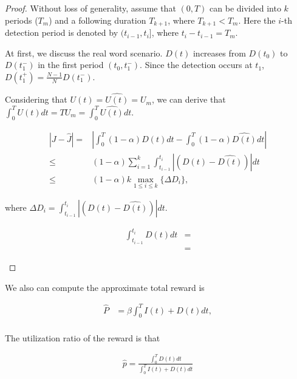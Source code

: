 \begin{proof}
Without loss of generality,
assume that $(0, T)$ can be divided into $k$ periods ($T_{m}$) and a following duration $T_{k+1}$, where $T_{k+1} < T_{m}$.
Here the $i$-th detection period is denoted by $(t_{i-1}, t_{i}]$, where $t_{i} - t_{i-1} = T_{m}$.

At first, we discuss the real word scenario.
$D(t)$ increases from $D(t_{0})$ to $D(t_{1}^{-})$ in the first period $(t_{0}, t_{1}^{-})$.
Since the detection occurs at $t_{1}$, $D(t_{1}^{+}) = \frac{N-1}{N}D(t_{1}^{-})$.

Considering that $U(t)= \hat{U(t)} = U_{m}$, 
we can derive that $\int_{0}^{T} U(t) dt = T U_{m} 
= \int_{0}^{T} \hat{U(t)} dt $.
\begin{small}
\begin{equation}
\label{eq:delta_J}
\begin{aligned}
|J - \hat{J}| = & | \int_{0}^{T} (1-\alpha)D(t) dt - \int_{0}^{T} (1-\alpha) \hat{D(t)} dt | \\
\le & (1-\alpha) \sum_{i=1}^{k} \int_{t_{i-1}}^{t_{i}} |(D(t)-\hat{D(t)})| dt \\
\le & (1-\alpha) k \max_{1 \le i \le k}\{ \Delta{D_{i}} \},
\end{aligned}
\end{equation}
\end{small}
where $\Delta{D_{i}} = \int_{t_{i-1}}^{t_{i}} |(D(t)-\hat{D(t)})| dt $.
\begin{small}
\begin{equation}
\nonumber
\begin{aligned}
\int_{t_{i-1}}^{t_{i}} D(t) dt 
&= \\
&= 
\end{aligned}
\end{equation}
\end{small}


\end{proof}

We also can compute the approximate total reward is
\begin{small}
\begin{equation}
\nonumber
\begin{aligned}
\hat{P} &= \beta \int_{0}^{T} I(t) + D(t) dt, \\
\end{aligned}
\end{equation}
\end{small}

The utilization ratio of the reward is that
\begin{small}
\begin{equation}
\nonumber
\begin{aligned}
\hat{p} = \frac{\int_{0}^{T} D(t) dt}{\int_{0}^{T} I(t) + D(t) dt}
\end{aligned}
\end{equation}
\end{small}


